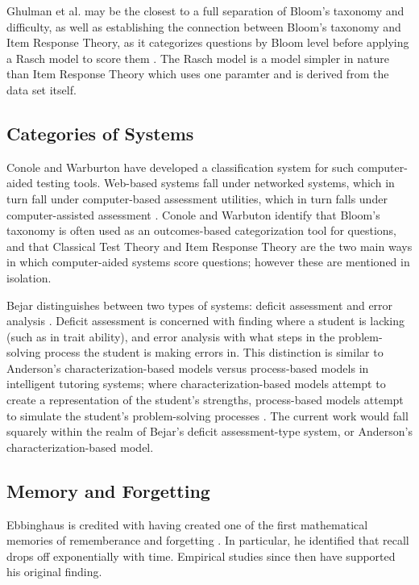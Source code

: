 Ghulman et al. may be the closest to a full separation of Bloom's taxonomy and
difficulty, as well as establishing the connection between Bloom's taxonomy and
Item Response Theory, as it categorizes questions by Bloom level before
applying a Rasch model to score them \cite{ghulman2009modern}.  The Rasch model
is a model simpler in nature than Item Response Theory which uses one paramter
and is derived from the data set itself.

\subsection{Categories of Systems}

Conole and Warburton have developed a classification system for such
computer-aided testing tools.  Web-based systems \cite{wang2004web} fall under
networked systems, which in turn fall under computer-based assessment
utilities, which in turn falls under computer-assisted assessment
\cite{conole2005review}.  Conole and Warbuton identify that Bloom's taxonomy is
often used as an outcomes-based categorization tool for questions, and that
Classical Test Theory and Item Response Theory are the two main ways in which
computer-aided systems score questions; however these are mentioned in
isolation.

Bejar distinguishes between two types of systems: deficit assessment and error
analysis \cite{bejar1984educational}.  Deficit assessment is concerned with
finding where a student is lacking (such as in trait ability), and error
analysis with what steps in the problem-solving process the student is making
errors in.  This distinction is similar to Anderson's characterization-based
models versus process-based models in intelligent tutoring systems; where
characterization-based models attempt to create a representation of the
student's strengths, process-based models attempt to simulate the student's
problem-solving processes \cite{anderson}.  The current work would fall
squarely within the realm of Bejar's deficit assessment-type system, or
Anderson's characterization-based model.

\subsection{Memory and Forgetting}

Ebbinghaus is credited with having created one of the first mathematical
memories of rememberance and forgetting \cite{ebbinghaus}.  In particular, he
identified that recall drops off exponentially with time.  Empirical studies
since then have supported his original finding.

